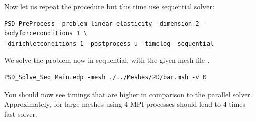 Now let us repeat the procedure but this time use sequential solver:

\begin{lstlisting}[style=BashInputStyle]
PSD_PreProcess -problem linear_elasticity -dimension 2 -bodyforceconditions 1 \
-dirichletconditions 1 -postprocess u -timelog -sequential
\end{lstlisting}

We solve the problem now in sequential, with the given mesh file
\psd{bar.msh}.

\begin{lstlisting}[style=BashInputStyle]
PSD_Solve_Seq Main.edp -mesh ./../Meshes/2D/bar.msh -v 0
\end{lstlisting}

You should now see timings that are higher in comparison to the parallel
solver. Approximately, for large meshes using 4 MPI processes should
lead to 4 times fast solver.
